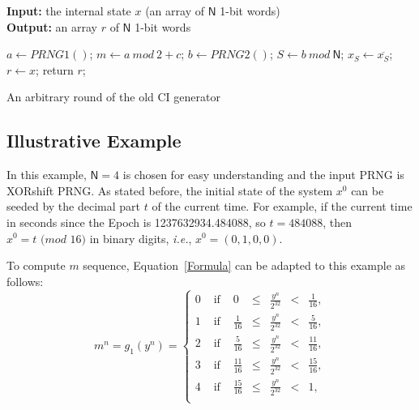 % 
\begin{algorithm}
\textbf{Input:} the internal state $x$ (an array of $\mathsf{N}$ 1-bit words)\\
\textbf{Output:} an array $r$ of $\mathsf{N}$ 1-bit words
\begin{algorithmic}[1]

\STATE$a\leftarrow{PRNG1()}$;
\STATE$m\leftarrow{a~mod~2+c}$;
\STATE$b\leftarrow{PRNG2()}$;
\STATE$S\leftarrow{b~mod~\mathsf{N}}$;
\STATE$x_S\leftarrow{ \overline{x_S}}$;
\ENDWHILE
\STATE$r\leftarrow{x}$;
\STATE return $r$;
\medskip
\caption{An arbitrary round of the old CI generator}
\label{Chaotic iteration2}
\end{algorithmic}
\end{algorithm}


\subsection{Illustrative Example}

In this example, $\mathsf{N} = 4$ is chosen for easy understanding and the input PRNG is XORshift PRNG.
As stated before, the initial state of the system $x^0$ can be seeded by the decimal part $t$ of the current time.
For example, if the current time in seconds since the Epoch is 1237632934.484088,
so $t = 484088$, then $x^0 = t \text{ ($mod$ 16)}$ in binary digits, \emph{i.e.}, $x^0 = ( 0, 1, 0, 0)$.

To compute $m$ sequence, Equation~\ref{Formula} can be adapted to this example as follows:
\begin{equation}
\label{m1 fuction}
m^n=g_1(y^n)=
\left\{
\begin{array}{llccccc}
0 & \text{ if }&0 &\leqslant&\frac{y^n}{2^{32}}&<&\frac{1}{16},\\
1 & \text{ if }&\frac{1}{16} &\leqslant&\frac{y^n}{2^{32}}&<&\frac{5}{16} ,\\
2 & \text{ if }&\frac{5}{16} &\leqslant&\frac{y^n}{2^{32}}&<&\frac{11}{16},\\
3 & \text{ if }&\frac{11}{16} &\leqslant&\frac{y^n}{2^{32}}&<&\frac{15}{16},\\
4 & \text{ if }&\frac{15}{16} &\leqslant&\frac{y^n}{2^{32}}&<&1,\\
\end{array}
\right.
\end{equation}

